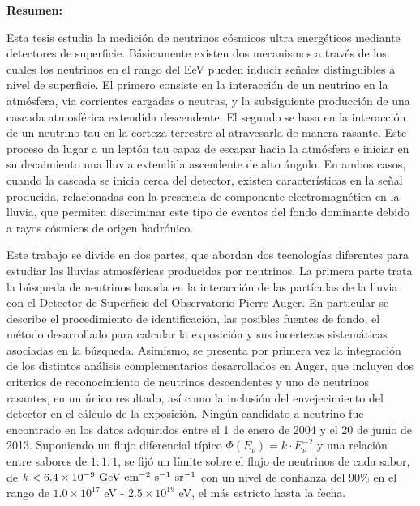 \begin{titlepage}


\noindent
\textbf{Resumen: }

Esta tesis estudia la medici\'on de neutrinos cósmicos ultra energéticos mediante detectores de superficie.
B\'asicamente existen dos mecanismos a trav\'es de los cuales los neutrinos en el rango del EeV pueden inducir señales distinguibles a nivel de superficie.
El primero consiste en la interacción de un neutrino en la atmósfera, via corrientes cargadas o neutras, y la subsiguiente producci\'on de una cascada atmosférica extendida descendente.
El segundo se basa en la interacción de un neutrino tau en la corteza terrestre al atravesarla de manera rasante.
Este proceso da lugar a un leptón tau capaz de escapar hacia la atmósfera e iniciar en su decaimiento una lluvia extendida ascendente de alto \'angulo.
En ambos casos, cuando la cascada se inicia cerca del detector, existen características en la señal producida, relacionadas con la presencia de componente electromagnética en la lluvia, que permiten discriminar este tipo de eventos del fondo dominante debido a rayos cósmicos de origen hadrónico.

Este trabajo se divide en dos partes, que abordan dos tecnolog\'ias diferentes para estudiar las lluvias atmosf\'ericas producidas por neutrinos.
La primera parte trata la b\'usqueda de neutrinos basada en la interacci\'on de las part\'iculas de la lluvia con el Detector de Superficie del Observatorio Pierre Auger.
En particular se describe el procedimiento de identificaci\'on, las posibles fuentes de fondo, el método desarrollado para calcular la exposición y sus incertezas sistemáticas asociadas en la b\'usqueda.
Asimismo, se presenta por primera vez la integración de los distintos análisis complementarios desarrollados en Auger, que incluyen dos criterios de reconocimiento de neutrinos descendentes y uno de neutrinos rasantes, en un único resultado, as\'i como la inclusión del envejecimiento del detector en el cálculo de la exposición.
Ningún candidato a neutrino fue encontrado en los datos adquiridos entre el 1 de enero de 2004 y el 20 de junio de 2013. Suponiendo un flujo diferencial típico $\Phi(E_\nu) = k\cdot E_\nu^{-2}$ y una relación entre sabores de $1:1:1$, se fijó un límite sobre el flujo de neutrinos de cada sabor, de $k < 6.4 \times 10^{-9}~{\rm GeV~cm^{-2}~s^{-1}~sr^{-1}}$ con un nivel de confianza del 90\% en el rango de ${1.0 \times 10^{17}}$ {eV} - ${2.5 \times 10^{19}}$ {eV}, el m\'as estricto hasta la fecha.


\end{titlepage}

